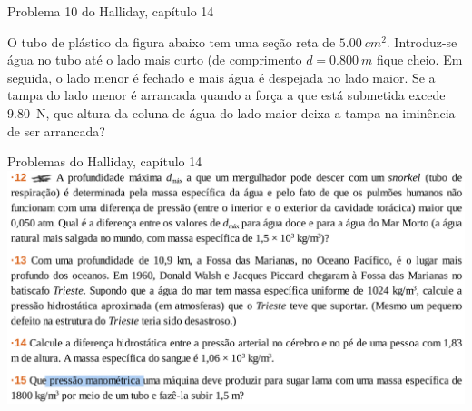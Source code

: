 \documentclass[t,%
brazilian,%
11pt,%
aspectratio=169,%
table%
]{beamer}
\begin{document}
\begin{frame}{Problema 10 do Halliday, capítulo 14}
    \begin{minipage}{\textwidth}
        O tubo de plástico da figura abaixo tem uma seção reta de \(\SI{5,00}{cm^2}\).
        Introduz-se água no tubo até o lado mais curto (de comprimento \(d= \SI{0,800}{m}\) fique
        cheio. Em seguida, o lado menor é fechado e mais água é despejada no lado maior. Se a tampa do lado menor
        é arrancada quando a força a que está submetida excede \SI{9,80}{N}, que altura da coluna de água do lado
        maior deixa a tampa na iminência de ser arrancada?
    \end{minipage}

    \vspace{1cm}\centering
\end{frame}

\begin{frame}{Problemas do Halliday, capítulo 14}
    \includegraphics[height=\textheight-28pt]{images/Captura de tela de 2024-01-11 14-57-52.png}
\end{frame}

\end{document}
